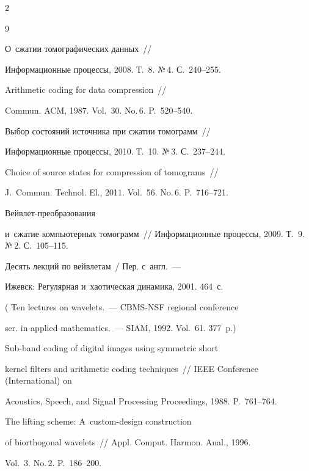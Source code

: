 \begin{multicols}{2}
{\small\frenchspacing

 {%


 \begin{thebibliography}{9}


 О~сжатии томографических данных~// 

Информационные процессы, 2008. Т.~8. №\,4. С.~240--255.


 Arithmetic coding for data compression~// 

Commun. ACM, 1987. Vol.~30. No.\,6. P.~520--540.


 Выбор состояний источника при сжатии томограмм~// 

Информационные процессы, 2010. Т.~10. №\,3. С.~237--244.


  Choice of source states for compression of tomograms~// 

J.~Commun. Technol. El., 2011. Vol.~56. No.\,6. P.~716--721.


  Вей\-в\-лет-пре\-об\-ра\-зо\-ва\-ния 

и~сжатие компьютерных томограмм~// Информационные процессы, 2009. Т.~9. №\,2. С.~105--115.


 Десять лекций по вейвлетам~/ Пер. с~англ.~--- 

Ижевск: Регулярная и~хаотическая динамика, 2001. 464~с. 

( Ten lectures on wavelets.~--- CBMS-NSF regional conference 

ser. in applied mathematics.~--- SIAM, 1992. Vol.~61. 377~p.)


  Sub-band coding of digital images using symmetric short 

kernel filters and arithmetic coding techniques~// IEEE  Conference  (International) on

Acoustics,  Speech, and Signal Processing Proceedings, 1988. P.~761--764.


 The lifting scheme: A~custom-design construction 

of biorthogonal wavelets~//  Appl. Comput. Harmon. Anal., 1996.  

Vol.~3. No.\,2. P.~186--200.

 \end{thebibliography}



 }

 }



\end{multicols}



